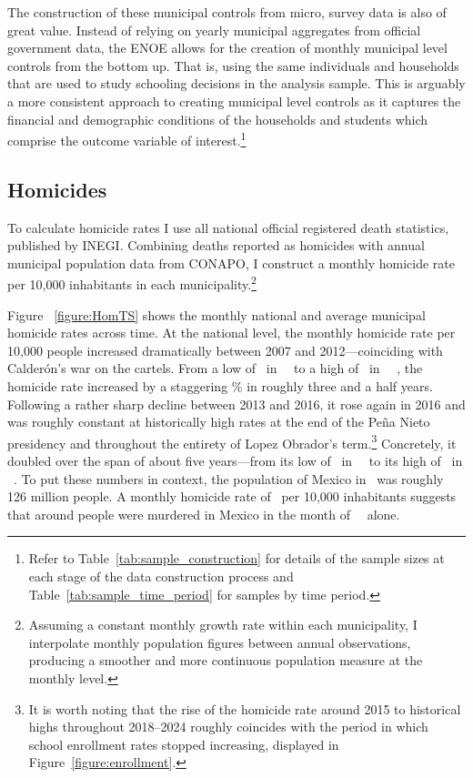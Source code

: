 \documentclass[12pt,letter,english,intoc,bibliography=totoc,index=totoc,BCOR10mm,captions=tableheading,nottitlepage,fleqn]{article}
\theoremstyle{break}
\begin{document}
The construction of these municipal controls from micro, survey data is also of great value. Instead of relying on yearly municipal aggregates from official government data, the ENOE allows for the creation of monthly municipal level controls from the bottom up. That is, using the same individuals and households that are used to study schooling decisions in the analysis sample. This is arguably a more consistent approach to creating municipal level controls as it captures the financial and demographic conditions of the households and students which comprise the outcome variable of interest.\footnote{Refer to Table~\ref{tab:sample_construction} for details of the sample sizes at each stage of the data construction process and Table~\ref{tab:sample_time_period} for samples by time period.}  

\subsection{Homicides}
To calculate homicide rates I use all national official registered death statistics, published by INEGI. Combining deaths reported as homicides with annual municipal population data from CONAPO, I construct a monthly homicide rate per 10,000 inhabitants in each municipality.\footnote{Assuming a constant monthly growth rate within each municipality, I interpolate monthly population figures between annual observations, producing a smoother and more continuous population measure at the monthly level.} 

Figure ~\ref{figure:HomTS} shows the monthly national and average municipal homicide rates across time. At the national level, the monthly homicide rate per 10,000 people increased dramatically between 2007 and 2012---coinciding with Calder\'{o}n's war on the cartels. From a low of \CalderonMinHR\ in \CalderonMinMonthName\ \CalderonMinYear\ to a high of \CalderonMaxHR\ in \CalderonMaxMonthName\ \CalderonMaxYear\ , the homicide rate increased by a staggering \% in roughly three and a half years.  Following a rather sharp decline between 2013 and 2016, it rose again in 2016 and was roughly constant at historically high rates at the end of the Pe\~{n}a Nieto presidency and throughout the entirety of Lopez Obrador's term.\footnote{It is worth noting that the rise of the homicide rate around 2015 to historical highs throughout 2018--2024 roughly coincides with the period in which school enrollment rates stopped increasing, displayed in Figure~\ref{figure:enrollment}.} Concretely, it doubled over the span of about five years---from its low of \InterimMinHR\ in \InterimMinMonthName\ \InterimMinYear\ to its high of \RespikeMaxHR\ in \RespikeMaxMonthName\ \RespikeMaxYear. To put these numbers in context, the population of Mexico in \RespikeMaxYear\ was roughly 126 million people. A monthly homicide rate of \RespikeMaxHR\ per 10,000 inhabitants suggests that around  people were murdered in Mexico in the month of \RespikeMaxMonthName\ \RespikeMaxYear\ alone.
\end{document}
